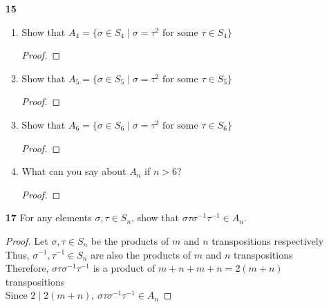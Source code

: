 \documentclass[paper=usletter, fontsize=12pt]{article}
\begin{document}
\begin{itemize}
\begin{itemize}
\begin{proof}
                Which forms the set
                \begin{align*}
                    \gl_2(\mathbb{C}) & = \{e,a,a^2,a^3,b,ab,a^2b,a^3b\}, \text{ with } a^4=b^2=e, \ ba=a^{-1}b\\
                    & \cong D_4 \qedhere
                \end{align*}

            \end{proof}

            \item[\textbf{15}]
            \begin{enumerate}[label=\textbf{(\alph*)}]

                \item Show that $A_4=\{\sigma \in S_4 \mid \sigma = \tau^2
                \text{ for some } \tau \in S_4\}$
                \begin{proof}
                \end{proof}

                \item Show that $A_5=\{\sigma \in S_5 \mid \sigma = \tau^2
                \text{ for some } \tau \in S_5\}$
                \begin{proof}
                \end{proof}

                \item Show that $A_6=\{\sigma \in S_6 \mid \sigma = \tau^2
                \text{ for some } \tau \in S_6\}$
                \begin{proof}
                \end{proof}

                \item What can you say about $A_n$ if $n>6$?
                \begin{proof}
                \end{proof}

            \end{enumerate}

            \item[\textbf{17}] For any elements $\sigma, \tau \in S_n$, show
            that $\sigma\tau\sigma^{-1}\tau^{-1}\in A_n$.
            \begin{proof}

                Let $\sigma,\tau \in S_n$ be the products of $m$ and $n$
                transpositions respectively\\
                Thus, $\sigma^{-1},\tau^{-1} \in S_n$ are also the products of
                $m$ and $n$ transpositions\\
                Therefore, $\sigma\tau\sigma^{-1}\tau^{-1}$ is a product of
                $m+n+m+n=2(m+n)$ transpositions\\
                Since $2 \mid 2(m+n)$, $\sigma\tau\sigma^{-1}\tau^{-1} \in A_n$
                \qedhere


\end{proof}
\end{itemize}
\end{itemize}
\end{document}
